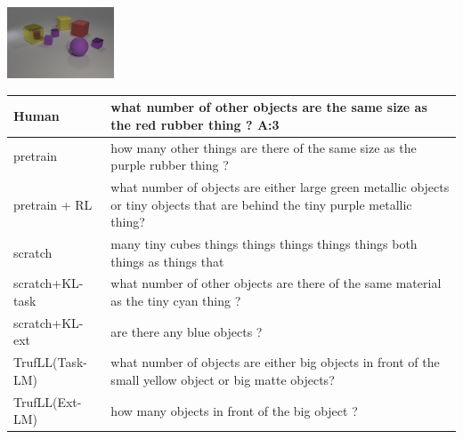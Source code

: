 \documentclass{article}
\newcommand{\algo}{TrufLL\xspace}
\begin{document}
\begin{table}[h!]
  \begin{minipage}{0.2\linewidth}
        \includegraphics[width=120px]{./CLEVR_val_004951.png}
	\end{minipage}
	 \hspace{1.2cm}
	\begin{minipage}{0.80\linewidth}
		\scriptsize
		\begin{tabular}{ll}
			Human           & what number of other objects are the same size as the red rubber thing ?  \quad \textbf{A:3} \\
			\midrule
			pretrain        & how many other things are there of the same size as the purple rubber thing ? \\
		    pretrain + RL   & what number of objects are either large green metallic objects or tiny objects that are behind the tiny purple metallic thing? \\ \midrule
			scratch         & many tiny cubes things things things things things both things as things that  \\
			scratch+KL-task & what number of other objects are there of the same material as the tiny cyan thing ? \\
			scratch+KL-ext  & are there any blue objects ?\\ \midrule
			\algo(Task-LM) & what number of objects are either big objects in front of the small yellow object or big matte objects? \\
			\algo(Ext-LM)   & how many objects in front of the big object ? \\
			\bottomrule
		\end{tabular}
	\end{minipage}
	\vspace{1mm}	


\end{table}
\end{document}

